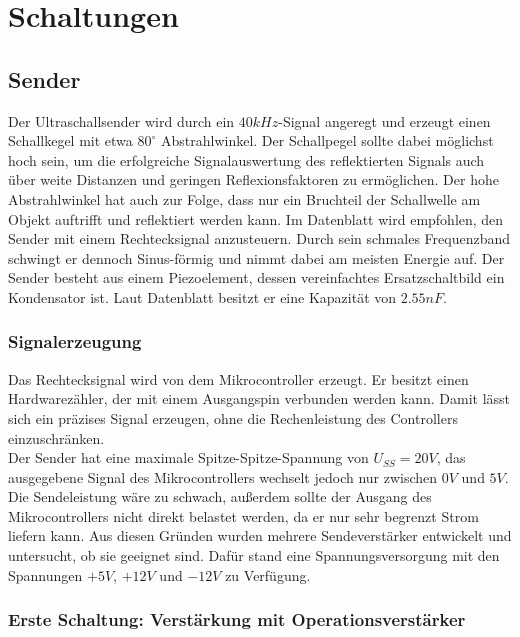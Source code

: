 
\chapter{Schaltungen}


\section{Sender}
Der Ultraschallsender wird durch ein $40 kHz$-Signal angeregt und erzeugt einen Schallkegel mit etwa $80^\circ$ Abstrahlwinkel. Der Schallpegel sollte dabei möglichst hoch sein, um die erfolgreiche Signalauswertung des reflektierten Signals auch über weite Distanzen und geringen Reflexionsfaktoren zu ermöglichen. Der hohe Abstrahlwinkel hat auch zur Folge, dass nur ein Bruchteil der Schallwelle am Objekt auftrifft und reflektiert werden kann. Im Datenblatt wird empfohlen, den Sender mit einem Rechtecksignal anzusteuern. Durch sein schmales Frequenzband schwingt er dennoch Sinus-förmig und nimmt dabei am meisten Energie auf. Der Sender besteht aus einem Piezoelement, dessen vereinfachtes Ersatzschaltbild ein Kondensator ist. Laut Datenblatt besitzt er eine Kapazität von $2.55nF$.\\


\subsection{Signalerzeugung}
Das Rechtecksignal wird von dem Mikrocontroller erzeugt. Er besitzt einen Hardwarezähler, der mit einem Ausgangspin verbunden werden kann. Damit lässt sich ein präzises Signal erzeugen, ohne die Rechenleistung des Controllers einzuschränken.\\
Der Sender hat eine maximale Spitze-Spitze-Spannung von $U_{SS} = 20V$, das ausgegebene Signal des Mikrocontrollers wechselt jedoch nur zwischen $0V$ und $5V$. Die Sendeleistung wäre zu schwach, außerdem sollte der Ausgang des Mikrocontrollers nicht direkt belastet werden, da er nur sehr begrenzt Strom liefern kann. Aus diesen Gründen wurden mehrere Sendeverstärker entwickelt und untersucht, ob sie geeignet sind. Dafür stand eine Spannungsversorgung mit den Spannungen $+5V$, $+12V$ und $-12V$ zu Verfügung.



\subsection{Erste Schaltung: Verstärkung mit Operationsverstärker}
